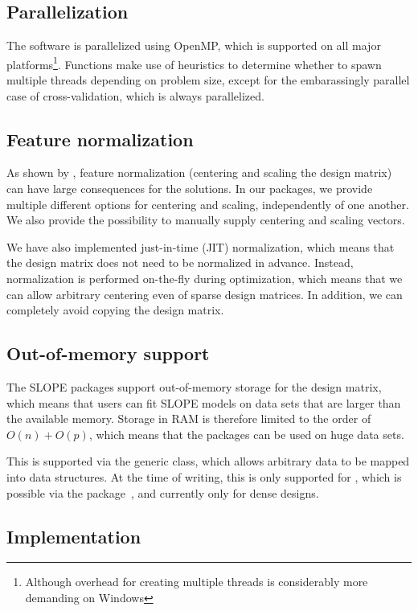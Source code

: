 \documentclass[article]{jss}
\begin{document}
\subsection{Parallelization}

The software is parallelized using OpenMP, which is supported
on all major platforms\footnote{Although overhead for creating
  multiple threads is considerably more demanding on Windows}.
Functions make use of heuristics to determine whether to
spawn multiple threads depending on problem size, except for
the embarassingly parallel case of cross-validation, which is always
parallelized.

\subsection{Feature normalization}

As shown by \citet{larsson2025}, feature normalization (centering and
scaling the design matrix) can have large consequences for the
solutions. In our packages, we provide multiple different options
for centering and scaling, independently of one another.
We also provide the possibility to manually supply centering
and scaling vectors.

We have also implemented just-in-time (JIT) normalization, which
means that the design matrix does not need to be normalized
in advance. Instead, normalization is performed on-the-fly during
optimization, which means that we can allow arbitrary centering
even of sparse design matrices. In addition, we can completely
avoid copying the design matrix.

\subsection{Out-of-memory support}

The SLOPE packages support out-of-memory storage for the design matrix, which
means that users can fit SLOPE models on data sets that are larger than the
available memory. Storage in RAM is therefore limited to the order of \(O(n) +
O(p)\), which means that the packages can be used on huge data sets.

This is supported via the generic  class, which allows
arbitrary data to be mapped into  data structures. At the
time of writing, this is only supported for ,
which is possible via the  package~\citep{kane2013},
and currently only for dense designs.

\subsection{Implementation}
\label{sec:implementation}
\end{document}
